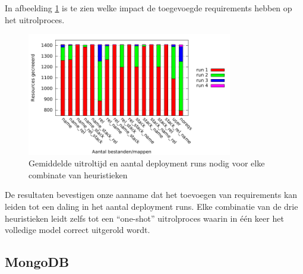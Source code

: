 In afbeelding \ref{fig:time_runs} is te zien welke impact de toegevoegde requirements hebben op het uitrolproces.

\begin{figure}[h]
    \begin{center}
    \includegraphics[width=0.8\textwidth]{images/time_runs.pdf}
    \caption{Gemiddelde uitroltijd en aantal deployment runs nodig voor elke combinate van heuristieken}
    \label{fig:time_runs}
    \end{center}
\end{figure}

De resultaten bevestigen onze aanname dat het toevoegen van requirements kan leiden tot een daling in het aantal deployment runs.
Elke combinatie van de drie heuristieken leidt zelfs tot een ``one-shot'' uitrolproces waarin in \'e\'en keer het volledige model correct uitgerold wordt.
\subsection{MongoDB}
